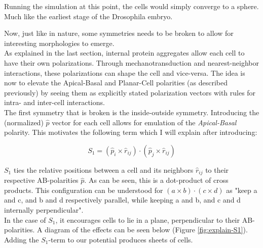 Running the simulation at this point, the cells would simply converge to a sphere. Much like the earliest stage of the Drosophila embryo.






Now, just like in nature, some symmetries needs to be broken to allow for interesting morphologies to emerge.\\

As explained in the last section, internal protein aggregates allow each cell to have their own polarizations. Through mechanotransduction and nearest-neighbor interactions, these polarizations can shape the cell and vice-versa. The idea is now to elevate the Apical-Basal and Planar-Cell polarities (as described previously) by seeing them as explicitly stated polarization vectors with rules for intra- and inter-cell interactions. \\

The first symmetry that is broken is the inside-outside symmetry. Introducing the (normalized) $\hat{p}$ vector for each cell allows for emulation of the \textit{Apical-Basal} polarity.
This motivates the following term which I will explain after introducing:

\begin{equation*}
    S_1=\left(\hat{p}_i \times \hat{r}_{i j}\right) \cdot\left(\hat{p}_j \times \hat{r}_{i j}\right)
\end{equation*}

$S_1$ ties the relative positions between a cell and its neighbors $\hat{r}_{i j}$ to their respective AB-polarities $\hat{p}$.
As can be seen, this is a dot-product of cross products. This configuration can be understood for $\left(a \times b\right) \cdot\left(c \times d\right)$ as "keep a and c, and b and d respectively parallel, while keeping a and b, and c and d internally perpendicular". \\ 

In the case of $S_1$, it encourages cells to lie in a plane, perpendicular to their AB-polarities. A diagram of the effects can be seen below (Figure \ref{fig:explain-S1}). Adding the $S_1$-term to our potential produces sheets of cells. 

